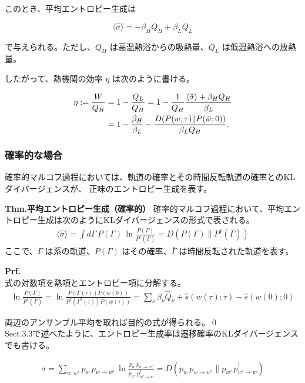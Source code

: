 \documentclass[a4paper,11pt]{jsarticle}
\numberwithin{equation}{section}
\begin{document}
このとき、平均エントロピー生成は

\[
\langle \hat{\sigma} \rangle = -\beta_H Q_H + \beta_L Q_L
\]

で与えられる。ただし、$Q_H$ は高温熱浴からの吸熱量、$Q_L$ は低温熱浴への放熱量。

したがって、熱機関の効率 $\eta$ は次のように書ける。

\begin{align}
    \eta := \frac{W}{Q_H}
    &= 1 - \frac{Q_L}{Q_H}
    = 1 - \frac{1}{Q_H} \frac{\langle \hat{\sigma} \rangle + \beta_H Q_H}{\beta_L} \notag \\
    &= 1 - \frac{\beta_H}{\beta_L}
    - \frac{D(P(w; \tau) \| P(\bar{w}; 0))}{\beta_L Q_H}.
\end{align}

\subsubsection{確率的な場合}

確率的マルコフ過程においては、軌道の確率とその時間反転軌道の確率とのKLダイバージェンスが、
正味のエントロピー生成を表す。

\begin{itembox}[l]{\textbf{Thm.平均エントロピー生成（確率的）}}
    確率的マルコフ過程において、平均エントロピー生成は次のようにKLダイバージェンスの形式で表される。
\begin{align}
\langle \hat{\sigma} \rangle
= \int d\Gamma\, P(\Gamma)\, \ln \frac{P(\Gamma)}{P^{\dagger}(\bar{\Gamma})}
= D(P(\Gamma) \| P^{\dagger}(\bar{\Gamma}))
\end{align}
ここで、$\Gamma$ は系の軌道、$P(\Gamma)$ はその確率、$\bar{\Gamma}$ は時間反転された軌道を表す。
\end{itembox}
\textbf{Prf.} \\
式の対数項を熱項とエントロピー項に分解する。
\begin{align}
\ln \frac{P(\Gamma)}{P^{\dagger}(\bar{\Gamma})}
= \ln \frac{P(\Gamma(\tau)) P(w(0))}{P^{\dagger}(\Gamma^{\dagger}(\tau)) P(w(\tau))}
= \sum_\nu \beta_\nu \hat{Q}_\nu + \hat{s}(w(\tau); \tau) - \hat{s}(w(0); 0)
\end{align}

両辺のアンサンブル平均を取れば目的の式が得られる。\qed\\

Sect.3.3で述べたように、エントロピー生成率は遷移確率のKLダイバージェンスでも書ける。

\begin{align}
\dot{\sigma} 
= \sum_{w, w'} p_w\, p_{w \to w'}\, \ln \frac{p_w\, p_{w \to w'}}{p_{w'}\, p^{\dagger}_{w' \to w}}
= D(p_w\, p_{w \to w'} \| p_{w'}\, p^{\dagger}_{w' \to w})
\end{align}
\end{document}
